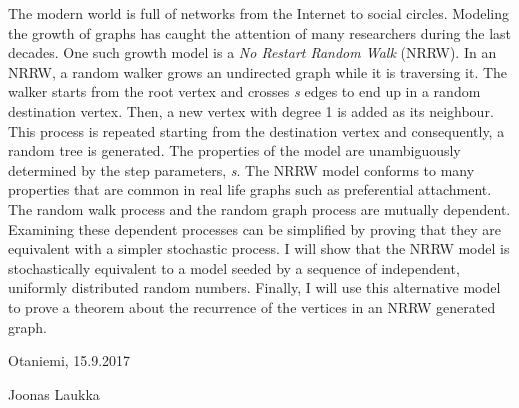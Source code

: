 \documentclass[finnish, 12pt, a4paper, sci, utf8, pdfa]{aaltothesis}
\begin{document}
\newpage
\begin{abstractpage}[english]
The modern world is full of networks from the Internet to social circles. Modeling the growth
of graphs has caught the attention of many researchers during the last decades. One such growth model
is a \textit{No Restart Random Walk} (NRRW). In an NRRW, a random walker grows
an undirected graph while it is traversing it. The walker starts from the root vertex and crosses \textit{s}
edges to end up in a random destination vertex. Then, a new vertex with degree 1 is added as its neighbour. 
This process is repeated starting from the destination vertex and consequently, a random tree is generated. 
The properties of the model are unambiguously determined by the step parameters, \textit{s}.
The NRRW model conforms to many properties that are common in real life graphs such as
preferential attachment. The random walk process and the random graph process are
mutually dependent. Examining these dependent processes can be simplified by proving that they
are equivalent with a simpler stochastic process. I will show that the NRRW model is stochastically
equivalent to a model seeded by a sequence of independent, uniformly distributed random numbers. Finally, I
will use this alternative model to prove a theorem about the recurrence of the vertices in an NRRW 
generated graph.
\end{abstractpage}

\newpage



\vspace{5cm}
Otaniemi, 15.9.2017

\vspace{5mm}
{\hfill Joonas Laukka \hspace{1cm}}

\newpage
\end{document}
